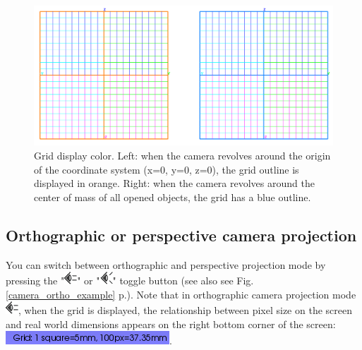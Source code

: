 \begin{figure}
  \centering
  \includegraphics[scale=0.4]{images/06/camera/grids.png} 
	\caption{Grid display color. Left: when the camera revolves around the origin of the coordinate system (x=0, y=0, z=0), the grid outline is displayed in orange. Right: when the camera revolves around the center of mass of all opened objects, the grid has a blue outline.}
\label{grid_color}
 
\end{figure}

 
\subsection{Orthographic or perspective camera projection}
You can switch between orthographic and perspective projection mode by pressing the "\includegraphics[scale=0.7]{images/06/camera/camera_ortho.png}" or "\includegraphics[scale=0.7]{images/06/camera/camera_persp}" toggle button (see also see Fig. \ref{camera_ortho_example} p.\pageref{camera_ortho_example}).
Note that in orthographic camera projection mode \includegraphics[scale=0.7]{images/06/camera/camera_ortho.png}, when the grid is displayed, the relationship between pixel size on the screen and real world dimensions appears on the right bottom corner of the screen: \includegraphics[scale=0.7]{images/06/camera/grid_infos.png}. 

